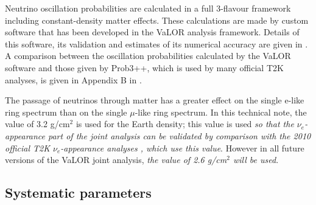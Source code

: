 Neutrino oscillation probabilities are calculated in a full 3-flavour framework including constant-density matter effects.
These calculations are made by custom software that has been developed in the VaLOR analysis framework. Details of this software,
its validation and estimates of its numerical accuracy are given in \cite{OurRun1and2Analysis3F}. A comparison between the
oscillation probabilities calculated by the VaLOR software and those given by Prob3++, which is used by many official T2K analyses,
is given in Appendix B in \cite{OurRun1and2and3Analysis3F}.

The passage of neutrinos through matter has a greater effect on the single e-like ring spectrum than on the single $\mu$-like
ring spectrum. In this technical note, the value of 3.2 g/cm$^{2}$ is used for the Earth density; this value is used \emph{so that 
the $\nu_{e}$-appearance part of the joint analysis can be validated by comparison with the 2010 official T2K $\nu_{e}$-appearance 
analyses \cite{NueRun1Analysis, NueRun1and2Analysis}, which use this value}. However in all future versions of the VaLOR joint
analysis, \emph{the value of 2.6 g/cm$^{2}$ will be used}.


\subsection{Systematic parameters}
\label{sec:list_systematics}

